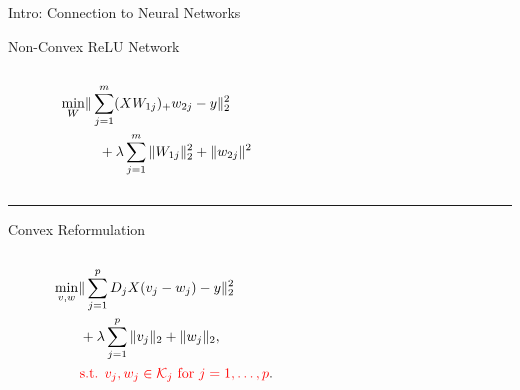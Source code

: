 \documentclass[usenames,dvipsnames,mathserif,notheorems]{beamer}
\newcommand{\horizontalrule}{
	{
			\vspace{-0.5em}
			\center \rule{\textwidth}{0.1em}
			\vspace{-0.2em}
		}
}
\begin{document}
\begin{frame}{Intro: Connection to Neural Networks}

	\vspace{0.2em}
	{\large Non-Convex ReLU Network}
	\vspace{-1em}
	\begin{columns}
		\centering
		\begin{column}{0.2\linewidth}
			\small
			\[
				\begin{aligned}
					\min_{W} & \|\sum_{j=1}^m (X W_{1j})_+ w_{2j} - y\|_2^2                  \\
					         & \quad + \lambda \sum_{j=1}^m \|W_{1j}\|_2^2 + \|w_{2j}\|^2
				\end{aligned}
			\]
		\end{column}

		\begin{column}{0.7\linewidth}
			\begin{figure}[t]
				\raggedleft
				
			\end{figure}
		\end{column}
	\end{columns}

	\pause
	\horizontalrule

	{\large Convex Reformulation} \citep{pilanci2020convex}
	\vspace{-2em}
	\begin{columns}
		\begin{column}{0.2\linewidth}
			\vspace{1.5em}
			\small
			\[
				\begin{aligned}
					\min_{v, w} & \|\sum_{j=1}^p D_j X (v_j - w_j) - y\|_2^2                       \\
					            & \hspace{0.1em } + \lambda \sum_{j=1}^p \|v_j\|_2 + \|w_j\|_2, \\
					            & \hspace{0.1em}
					\textcolor{red}{\text{s.t. }
						v_j, w_j \in \mathcal{K}_j \text{ for } j = 1,\ldots,p
					}.
				\end{aligned}
			\]
		\end{column}
		\begin{column}{0.7\linewidth}
			\vspace{-1.5em}
			\begin{figure}[t]
				\raggedleft
				
			\end{figure}
		\end{column}
	\end{columns}
\end{frame}
\end{document}
